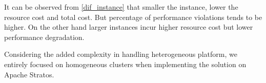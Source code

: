 It can be observed from \ref{dif_instance} that smaller the instance, lower the resource cost and total cost. But percentage of performance violations tends to be higher. On the other hand larger instances incur higher resource cost but lower performance degradation. 

Considering the added complexity in handling heterogeneous platform, we entirely focused on homogeneous clusters when implementing the solution on Apache Stratos.